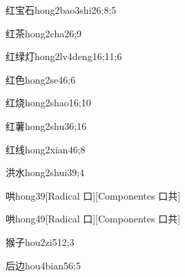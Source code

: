 \begin{verbete}{红宝石}{hong2bao3shi2}{6;8;5}
\end{verbete}

\begin{verbete}{红茶}{hong2cha2}{6;9}
\end{verbete}

\begin{verbete}{红绿灯}{hong2lv4deng1}{6;11;6}
\end{verbete}

\begin{verbete}{红色}{hong2se4}{6;6}
\end{verbete}

\begin{verbete}{红烧}{hong2shao1}{6;10}
\end{verbete}

\begin{verbete}{红薯}{hong2shu3}{6;16}
\end{verbete}

\begin{verbete}{红线}{hong2xian4}{6;8}
\end{verbete}

\begin{verbete}{洪水}{hong2shui3}{9;4}
\end{verbete}

\begin{verbete}{哄}{hong3}{9}[Radical 口][Componentes 口共]
\end{verbete}

\begin{verbete}{哄}{hong4}{9}[Radical 口][Componentes 口共]
\end{verbete}

\begin{verbete}{猴子}{hou2zi5}{12;3}
\end{verbete}

\begin{verbete}{后边}{hou4bian5}{6;5}
\end{verbete}

